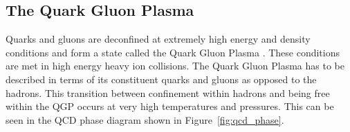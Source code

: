 



\subsection{The Quark Gluon Plasma}
\label{sec:qgp}
Quarks and gluons are deconfined at extremely high energy and density conditions and form a state called the Quark Gluon Plasma \cite{SHURYAK198071}. These conditions are met in high energy heavy ion collisions. 
The Quark Gluon Plasma has to be described in terms of its constituent quarks and gluons as opposed to the hadrons. This transition between confinement within hadrons and being free within the QGP occurs at very high temperatures and pressures. This can be seen in the QCD phase diagram shown in Figure~\ref{fig:qcd_phase}. 

